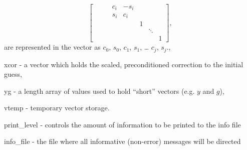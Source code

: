 \begin{args}
\begin{equation*}
\begin{bmatrix}
        &        &   & c_i & -s_i &   &        &   \\
        &        &   & s_i &  c_i &   &        &   \\
        &        &   &     &      & 1 &        &   \\
        &        &   &     &      &   & \ddots &   \\
        &        &   &     &      &   &        & 1\end{bmatrix},
    \end{equation*}
    are represented in the  vector as 
    $c_0$,  $s_0$,  $c_1$,
     $s_1$, \ldots {} $c_j$,
     $s_j$.,
  \item[xcor] - a vector which holds the scaled, preconditioned
    correction to the initial guess,
  \item[yg] - a length  array of  values
    used to hold ``short'' vectors (e.g. $y$ and $g$),
  \item[vtemp] - temporary vector storage.
  \item[print\_level] - controls the amount of information to be printed to the info file
  \item[info\_file]   - the file where all informative (non-error) messages will be directed
\end{args}

